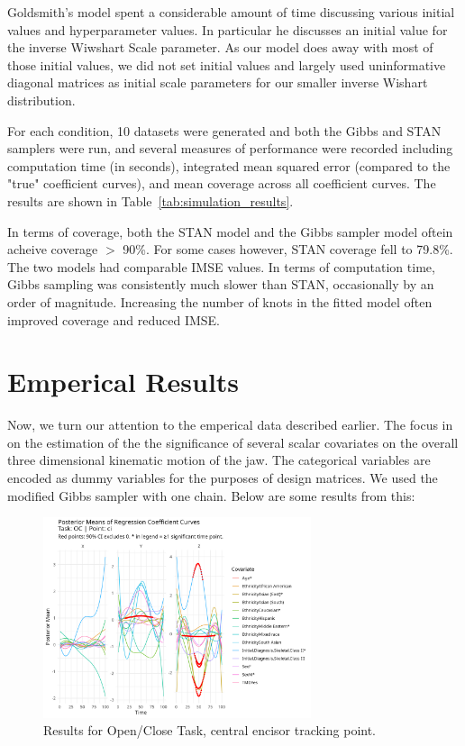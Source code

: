 \documentclass[AMA,Times1COL]{WileyNJDv5} %
\begin{document}
Goldsmith's model spent a considerable amount of time discussing various initial values and hyperparameter values.  In particular he discusses an initial value for the inverse Wiwshart Scale parameter.  As our model does away with most of those initial values, we did not set initial values and largely used uninformative diagonal matrices as initial scale parameters for our smaller inverse Wishart distribution.

For each condition, 10 datasets were generated and both the Gibbs and STAN samplers were run, and several measures of performance were recorded including computation time (in seconds), integrated mean squared error (compared to the "true" coefficient curves), and mean coverage across all coefficient curves.  The results are shown in Table~\ref{tab:simulation_results}.  

In terms of coverage, both the STAN model and the Gibbs sampler model oftein acheive coverage \(>\) 90\%.  For some cases however, STAN coverage fell to 79.8\%.  The two models had comparable IMSE values.  In terms of computation time, Gibbs sampling was consistently much slower than STAN, occasionally by an order of magnitude.  Increasing the number of knots in the fitted model often improved coverage and reduced IMSE.  

\section{Emperical Results}
Now, we turn our attention to the emperical data described earlier.  The focus in on the estimation of the the significance of several scalar covariates on the overall three dimensional kinematic motion of the jaw.  The categorical variables are encoded as dummy variables for the purposes of design matrices.  We used the modified Gibbs sampler with one chain.  Below are some results from this: 

\begin{figure}[h]
    \centering
    \includegraphics[width = 0.7\textwidth]{oc_ci_plot.jpeg}
    \caption{Results for Open/Close Task, central encisor tracking point.}
    \label{fig:oc_ci}
\end{figure}
\end{document}
